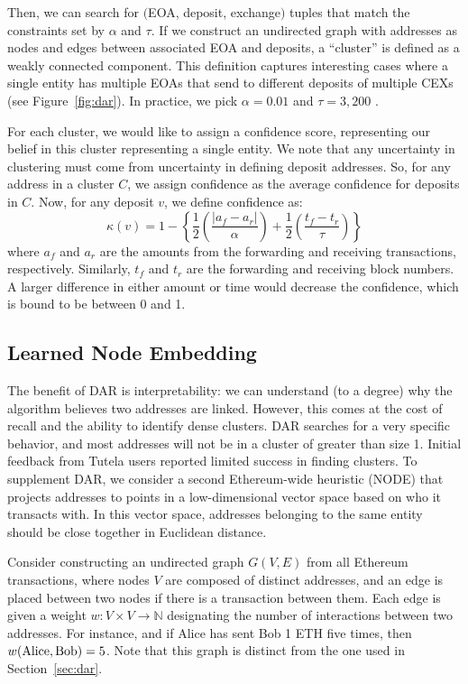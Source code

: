 Then, we can search for $($EOA, deposit, exchange$)$ tuples that match the constraints set by $\alpha$ and $\tau$.
If we construct an undirected graph with addresses as nodes and edges between associated EOA and deposits, a ``cluster'' is defined as a weakly connected component. This definition captures interesting cases where a single entity has multiple EOAs that send to different deposits of multiple CEXs (see Figure~\ref{fig:dar}). In practice, we pick $\alpha = 0.01$ and $\tau = 3,200$ \citep{victor2020address}.

For each cluster, we would like to assign a confidence score, representing our belief in this cluster representing a single entity. We note that any uncertainty in clustering must come from uncertainty in defining deposit addresses. So, for any address in a cluster $C$, we assign  confidence as the average confidence for deposits in $C$. Now, for any deposit $v$, we define confidence as:
\begin{equation*}
\kappa(v) = 1 - \left\{ \frac{1}{2}\left(\frac{|a_f - a_r|}{\alpha}\right) + \frac{1}{2}\left(\frac{t_f - t_r}{\tau}\right) \right\}
\end{equation*}
where $a_f$ and $a_r$ are the amounts from the forwarding and receiving transactions, respectively. Similarly, $t_f$ and $t_r$ are the forwarding and receiving block numbers.
A larger difference in either amount or time would decrease the confidence, which is bound to be between 0 and 1.

\subsection{Learned Node Embedding}

The benefit of DAR is interpretability: we can understand (to a degree) why the algorithm believes two addresses are linked. However, this comes at the cost of recall and the ability to identify dense clusters. DAR searches for a very specific behavior, and most addresses will not be in a cluster of greater than size 1. Initial feedback from Tutela users reported limited success in finding clusters.
To supplement DAR, we consider a second Ethereum-wide heuristic (NODE) that projects addresses to points in a low-dimensional vector space based on who it transacts with. In this vector space, addresses belonging to the same entity should be close together in Euclidean distance.

Consider constructing an undirected graph $G(V, E)$ from all Ethereum transactions, where nodes $V$ are composed of distinct addresses, and an edge is placed between two nodes if there is a transaction between them. Each edge is given a weight $w: V \times V \rightarrow \mathbb{N}$ designating the number of interactions between two addresses. For instance, and if Alice has sent Bob 1 ETH five times,  then $w(\textup{Alice}, \textup{Bob}) = 5$. Note that this graph is distinct from the one used in Section~\ref{sec:dar}.

